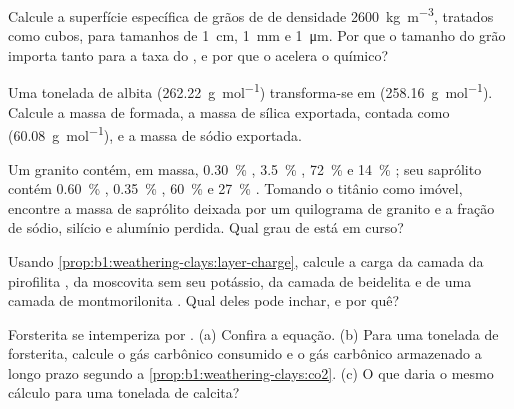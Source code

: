 \begin{exercise}[$\star\star$]\label{exo:b1:weathering-clays:5}
Calcule a superfície específica de grãos de  de densidade
\qty{2600}{kg.m^{-3}}, tratados como cubos, para tamanhos de \qty{1}{cm}, \qty{1}{mm} e \qty{1}{\micro m}. Por que o tamanho do grão importa tanto para a taxa do , e por que o  acelera o químico?
\end{exercise}

\begin{exercise}[$\star\star$]\label{exo:b1:weathering-clays:6}
Uma tonelada de albita  (\qty{262.22}{g.mol^{-1}}) transforma-se em  (\qty{258.16}{g.mol^{-1}}). Calcule a massa de  formada, a massa de sílica exportada, contada como  (\qty{60.08}{g.mol^{-1}}), e a massa de sódio exportada.
\end{exercise}

\begin{exercise}[$\star\star$]\label{exo:b1:weathering-clays:7}
Um granito contém, em massa, \qty{0.30}{\percent} , \qty{3.5}{\percent}
, \qty{72}{\percent}  e \qty{14}{\percent} ; seu saprólito contém \qty{0.60}{\percent} , \qty{0.35}{\percent}
, \qty{60}{\percent}  e \qty{27}{\percent} . Tomando o titânio como imóvel, encontre a massa de saprólito deixada por um quilograma de granito e a fração de sódio, silício e alumínio perdida. Qual grau de  está em curso?
\end{exercise}

\begin{exercise}[$\star\star$]\label{exo:b1:weathering-clays:8}
Usando \cref{prop:b1:weathering-clays:layer-charge}, calcule a carga da camada da pirofilita , da moscovita  sem seu potássio, da camada de beidelita  e de uma camada de montmorilonita . Qual deles pode inchar, e por quê?
\end{exercise}

\begin{exercise}[$\star\star$]\label{exo:b1:weathering-clays:9}
Forsterita  se intemperiza por
. (a) Confira a equação. (b) Para uma tonelada de forsterita, calcule o gás carbônico consumido e o gás carbônico armazenado a longo prazo segundo a
\cref{prop:b1:weathering-clays:co2}. (c) O que daria o mesmo cálculo para uma tonelada de calcita?
\end{exercise}


